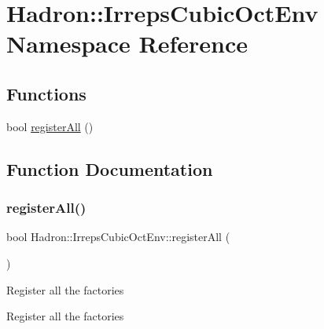\hypertarget{namespaceHadron_1_1IrrepsCubicOctEnv}{}\section{Hadron\+:\+:Irreps\+Cubic\+Oct\+Env Namespace Reference}
\label{namespaceHadron_1_1IrrepsCubicOctEnv}
\subsection*{Functions}
\begin{DoxyCompactItemize}
\item 
bool \mbox{\hyperlink{namespaceHadron_1_1IrrepsCubicOctEnv_add350f077e8bf956336f99fe5dc1c29d}{register\+All}} ()
\end{DoxyCompactItemize}


\subsection{Function Documentation}
\mbox{\label{namespaceHadron_1_1IrrepsCubicOctEnv_add350f077e8bf956336f99fe5dc1c29d}} 
\subsubsection{\texorpdfstring{registerAll()}{registerAll()}}
{\footnotesize\ttfamily bool Hadron\+::\+Irreps\+Cubic\+Oct\+Env\+::register\+All (\begin{DoxyParamCaption}{ }\end{DoxyParamCaption})}

Register all the factories

Register all the factories

